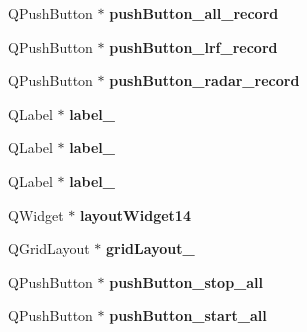 \begin{DoxyCompactItemize}
\item 
\hypertarget{class_ui___main_window_a5adab88c17cb54dd50673e2e11fc2050}{}Q\+Push\+Button $\ast$ {\bfseries push\+Button\+\_\+all\+\_\+record}\label{class_ui___main_window_a5adab88c17cb54dd50673e2e11fc2050}

\item 
\hypertarget{class_ui___main_window_adc53b67da0c68303a478f43a0470611b}{}Q\+Push\+Button $\ast$ {\bfseries push\+Button\+\_\+lrf\+\_\+record}\label{class_ui___main_window_adc53b67da0c68303a478f43a0470611b}

\item 
\hypertarget{class_ui___main_window_a3ad9df62ff36a4092762b2557acd93c8}{}Q\+Push\+Button $\ast$ {\bfseries push\+Button\+\_\+radar\+\_\+record}\label{class_ui___main_window_a3ad9df62ff36a4092762b2557acd93c8}

\item 
\hypertarget{class_ui___main_window_a5250e633d2b0dac0d683e2e2c83b8513}{}Q\+Label $\ast$ {\bfseries label\+\_}\label{class_ui___main_window_a5250e633d2b0dac0d683e2e2c83b8513}

\item 
\hypertarget{class_ui___main_window_a3c0552022c80477426ed3f6f932207a3}{}Q\+Label $\ast$ {\bfseries label\+\_}\label{class_ui___main_window_a3c0552022c80477426ed3f6f932207a3}

\item 
\hypertarget{class_ui___main_window_a6b1374dbb90bc0b5fa41b10e5173621e}{}Q\+Label $\ast$ {\bfseries label\+\_}\label{class_ui___main_window_a6b1374dbb90bc0b5fa41b10e5173621e}

\item 
\hypertarget{class_ui___main_window_ad4cfb275c84b954a2ac9794394d0d1dc}{}Q\+Widget $\ast$ {\bfseries layout\+Widget14}\label{class_ui___main_window_ad4cfb275c84b954a2ac9794394d0d1dc}

\item 
\hypertarget{class_ui___main_window_a3e3ee1a7d9c9d9d2004a5907306de885}{}Q\+Grid\+Layout $\ast$ {\bfseries grid\+Layout\+\_}\label{class_ui___main_window_a3e3ee1a7d9c9d9d2004a5907306de885}

\item 
\hypertarget{class_ui___main_window_a67d9a3de9fed8875a436e1c965f0126e}{}Q\+Push\+Button $\ast$ {\bfseries push\+Button\+\_\+stop\+\_\+all}\label{class_ui___main_window_a67d9a3de9fed8875a436e1c965f0126e}

\item 
\hypertarget{class_ui___main_window_ace49603772d63c2bce129426c8c9cd18}{}Q\+Push\+Button $\ast$ {\bfseries push\+Button\+\_\+start\+\_\+all}\label{class_ui___main_window_ace49603772d63c2bce129426c8c9cd18}


\end{DoxyCompactItemize}

